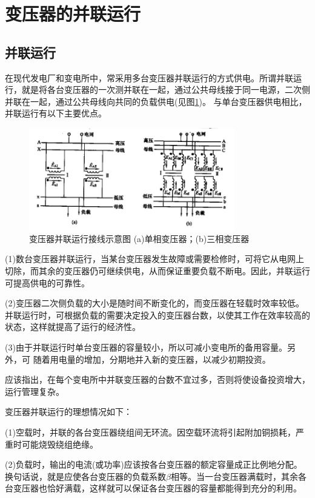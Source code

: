 \documentclass{book}
\begin{document}
\section{变压器的并联运行}
\subsection{并联运行}
在现代发电厂和变电所中，常采用多台变压器并联运行的方式供电。所谓并联运行，就是将各台变压器的一次测并联在一起，通过公共母线接于同一电源，二次侧并联在一起，通过公共母线向共同的负载供电(见图\ref{fig_4.13})。
与单台变压器供电相比，并联运行有以下主要优点。

\begin{figure}[H]
	\centering
	\includegraphics[width=0.80\textwidth]{4-13.png}
	\caption{变压器并联运行接线示意图
		(a)单相变压器；(b)三相变压器}
	\label{fig_4.13}
\end{figure}

(1)数台变压器并联运行，当某台变压器发生故障或需要检修时，可将它从电网上切除，而其余的变压器仍可继续供电，从而保证重要负载不断电。因此，并联运行可提高供电的可靠性。

(2)变压器二次侧负载的大小是随时间不断变化的，而变压器在轻载时效率较低。并联运行时，可根据负载的需要决定投入的变压器台数，以使其工作在效率较高的状态，这样就提高了运行的经济性。

(3)由于并联运行时单台变压器的容量较小，所以可减小变电所的备用容量。另外，可 随着用电量的增加，分期地并入新的变压器，以减少初期投资。

应该指出，在每个变电所中并联变压器的台数不宜过多，否则将使设备投资增大，运行管理复杂。

变压器并联运行的理想情况如下：

(1)空载时，并联的各台变压器绕组间无环流。因空载环流将引起附加铜损耗，严重时可能烧毁绕组绝缘。

(2)负载时，输出的电流(或功率)应该按各台变压器的额定容量成正比例地分配。换句话说，就是应使各台变压器的负载系数$\beta $相等。当一台变压器满载时，其余各台变压器也恰好满载，这样就可以保证各台变压器的容量都能得到充分的利用。
\end{document}
